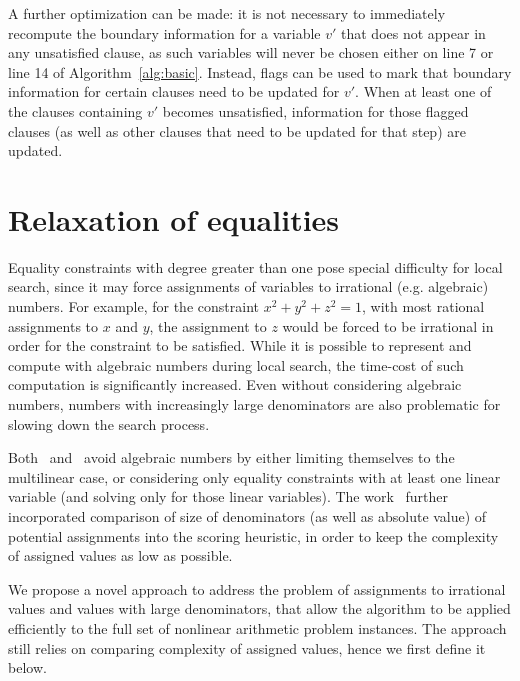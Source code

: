 \documentclass[runningheads]{llncs}
\begin{document}
\begin{remark}
A further optimization can be made: it is not necessary to immediately recompute the boundary information for a variable $v'$ that does not appear in any unsatisfied clause, as such variables will never be chosen either on line 7 or line 14 of Algorithm~\ref{alg:basic}. Instead, flags can be used to mark that boundary information for certain clauses need to be updated for $v'$. When at least one of the clauses containing $v'$ becomes unsatisfied, information for those flagged clauses (as well as other clauses that need to be updated for that step) are updated.
\end{remark}

\section{Relaxation of equalities}
\label{sec:relaxation-equalities}

Equality constraints with degree greater than one pose special difficulty for local search, since it may force assignments of variables to irrational (e.g. algebraic) numbers. For example, for the constraint $x^2+y^2+z^2=1$, with most rational assignments to $x$ and $y$, the assignment to $z$ would be forced to be irrational in order for the constraint to be satisfied. While it is possible to represent and compute with algebraic numbers during local search, the time-cost of such computation is significantly increased. Even without considering algebraic numbers, numbers with increasingly large denominators are also problematic for slowing down the search process.

Both~\cite{abs-2303-06676} and~\cite{LiXZ23} avoid algebraic numbers by either limiting themselves to the multilinear case, or considering only equality constraints with at least one linear variable (and solving only for those linear variables). The work~\cite{abs-2303-06676} further incorporated comparison of size of denominators (as well as absolute value) of potential assignments into the scoring heuristic, in order to keep the complexity of assigned values as low as possible.

We propose a novel approach to address the problem of assignments to irrational values and values with large denominators, that allow the algorithm to be applied efficiently to the full set of nonlinear arithmetic problem instances. The approach still relies on comparing complexity of assigned values, hence we first define it below.
\end{document}
